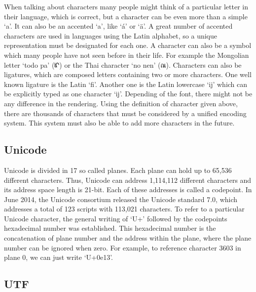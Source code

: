 \documentclass[a4paper, 12pt]{scrartcl} %
\begin{document}
When talking about characters many people might think of a particular letter in
their language, which is correct, but a character can be even more than a
simple `a'. It can also be an accented `a', like `\'a' or `\"a'. A great number
of accented characters are used in languages using the Latin alphabet, so a
unique representation must be designated for each one. A character can also be
a symbol which many people have not seen before in their life. For example the
Mongolian letter `todo pa' ({\mongolian ᡌ}) or the Thai character `no nen'
({\droidthai ณ}). Characters can also be ligatures, which are composed letters
containing two or more characters. One well known ligature is the Latin `fi'.
Another one is the Latin lowercase `i\breaklig j' which can be explicitly typed
as one character `ĳ'. Depending of the font, there might not be any difference
in the rendering.  Using the definition of character given above, there are
thousands of characters that must be considered by a unified encoding system.
This system must also be able to add more characters in the future.

\subsection{Unicode}

Unicode is divided in 17 so called \glspl{plane}. Each \gls{plane} can hold up
to 65,536 different characters. Thus, Unicode can address 1,114,112 different
characters and its address space length is 21-bit. Each of these addresses is
called a \gls{codepoint}. In June 2014, the Unicode consortium released the
Unicode standard 7.0, which addresses a total of 123 scripts with 113,021
characters. \cite{unicode7release} To refer to a particular Unicode character, the general
writing of `U+' followed by the \gls{codepoint}s hexadecimal number was
established. This hexadecimal number is the concatenation of \gls{plane} number
and the address within the \gls{plane}, where the \gls{plane} number can be
ignored when zero. For example, to reference character 3603 in \gls{plane} 0,
we can just write `U+0e13'.

\subsection{\acrlong{UTF}}
\end{document}
